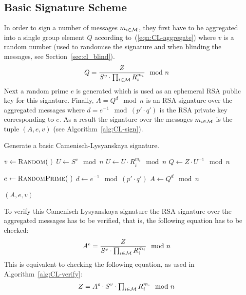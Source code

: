 \subsection{Basic Signature Scheme}\label{sec:cl_basic}

In order to sign a number of messages $m_{i \in \mathcal{M}}$, they first have to be
aggregated into a single group element $Q$ according to~(\ref{eqn:CL-aggregate})
where $v$ is a random number (used to randomise the signature and when blinding
the messages, see Section~\ref{sec:cl_blind}).
\begin{equation}\label{eqn:CL-aggregate}
  Q = \dfrac{Z}{S^v \cdot \prod_{i \in \mathcal{M}} R_i^{m_i}} \mod n
\end{equation}
Next a random prime $e$ is generated which is used as an ephemeral RSA public
key for this signature. Finally, $A = Q^d \mod n$ is an RSA signature over the
aggregated messages where $d = e^{-1} \mod (p' \cdot q')$ is the RSA private
key corresponding to $e$. As a result the signature over the messages
$m_{i \in \mathcal{M}}$ is the tuple $(A, e, v)$ (see Algorithm~\ref{alg:CL-sign}).

\begin{algorithm}
  \caption{Generate a basic Camenisch-Lysyanskaya signature.}
  \label{alg:CL-sign}
  \addtolength{\baselineskip}{1mm}
  \begin{algorithmic}[1]
      \State $v \gets \Call{Random}{~}$
      \State $U \gets S^v \mod n$
        \State $U \gets U \cdot R_i^{m_i} \mod n$
      \EndFor
      \State $Q \gets Z \cdot U^{-1} \mod n$

      \State $e \gets \Call{RandomPrime}{~}$
      \State $d \gets e^{-1} \mod (p' \cdot q')$
      \State $A \gets Q^d \mod n$

      \Return $(A, e, v)$
    \EndFunction
  \end{algorithmic}
\end{algorithm}

To verify this Camenisch-Lysyanskaya signature the RSA signature over the
aggregated messages has to be verified, that is, the following equation has to
be checked:
\begin{equation*}
  A^e = \dfrac{Z}{S^v \cdot \prod_{i \in \mathcal{M}} R_i^{m_i}} \mod n
\end{equation*}
This is equivalent to checking the following equation, as used in
Algorithm~\ref{alg:CL-verify}:
\begin{equation*}
  Z = A^e \cdot S^v \cdot \textstyle\prod_{i \in \mathcal{M}} R_i^{m_i} \mod n
\end{equation*}

